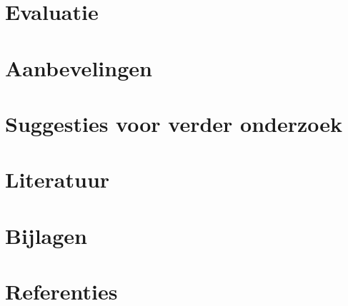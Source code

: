 \documentclass[11pt]{article}
\begin{document}
    \section{Evaluatie}


    \section{Aanbevelingen}


    \section{Suggesties voor verder onderzoek}


    \section{Literatuur}


    \section{Bijlagen}


    \section{Referenties}
\end{document}
